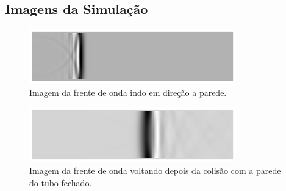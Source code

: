 \subsection{Imagens da Simulação}
\begin{figure}[h!]
    \centering
 	\hspace{-1.5cm}
    \includegraphics[width=0.8\textwidth]{code_matlab/code_refactored/closed-anechoic/normal.eps}
    \caption{Imagem da frente de onda indo em direção a parede.}
    \label{fig1}
\end{figure}
\begin{figure}[h!]
    \centering
 	\hspace{-1.5cm}
    \includegraphics[width=0.8\textwidth]{code_matlab/code_refactored/closed-closed/print_c_c.eps}
    \caption{Imagem da frente de onda voltando depois da colisão com a parede do tubo fechado.}
    \label{fig2}
\end{figure}

\newpage
